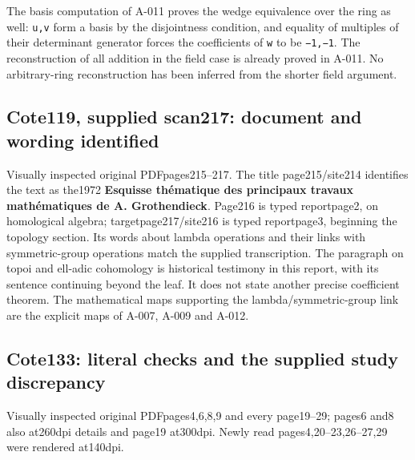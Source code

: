 \documentclass[
  10pt,
]{article}
\begin{document}
The basis computation of A-011 proves the wedge equivalence over the
ring as well: \texttt{\small u,\allowbreak{}v} form a basis by the
disjointness condition, and equality of multiples of their determinant
generator forces the coefficients of \texttt{\small w} to be
\texttt{\small −1,\allowbreak{}−1}. The reconstruction of all addition
in the field case is already proved in A-011. No arbitrary-ring
reconstruction has been inferred from the shorter field argument.

\subsection{Cote119, supplied scan217: document and wording
identified}\label{cote119-supplied-scan217-document-and-wording-identified}

Visually inspected original PDFpages215--217. The title page215/site214
identifies the text as the1972 \textbf{Esquisse thématique des
principaux travaux mathématiques de A. Grothendieck}. Page216 is typed
reportpage2, on homological algebra; targetpage217/site216 is typed
reportpage3, beginning the topology section. Its words about lambda
operations and their links with symmetric-group operations match the
supplied transcription. The paragraph on topoi and ell-adic cohomology
is historical testimony in this report, with its sentence continuing
beyond the leaf. It does not state another precise coefficient theorem.
The mathematical maps supporting the lambda/symmetric-group link are the
explicit maps of A-007, A-009 and A-012.

\subsection{Cote133: literal checks and the supplied study
discrepancy}\label{cote133-literal-checks-and-the-supplied-study-discrepancy}

Visually inspected original PDFpages4,6,8,9 and every page19--29; pages6
and8 also at260dpi details and page19 at300dpi. Newly read
pages4,20--23,26--27,29 were rendered at140dpi.
\end{document}
